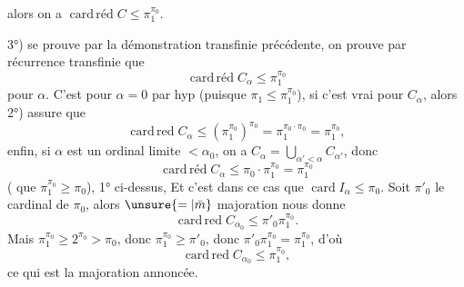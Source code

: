 alors on a $\operatorname{card\,réd}C\leq\pi_1^{\pi_0}$.

 3°) se prouve par la démonstration  transfinie précédente,  on prouve par récurrence transfinie que
\[
\operatorname{card\,réd}C_\alpha\leq\pi_1^{\pi_0}
\]
pour  $\alpha$. C'est  pour $\alpha=0$ par hyp (puisque $\pi_1\leq\pi_1^{\pi_0}$),  si c'est vrai pour $C_\alpha$, alors 2°) assure que
\[
\operatorname{card\,red}C_\alpha\leq(\pi_1^{\pi_0})^{\pi_0}=\pi_1^{\pi_0\cdot\pi_0}=\pi_1^{\pi_0},
\]
enfin, si $\alpha$ est un ordinal limite $<\alpha_0$, on a $C_\alpha=\bigcup_{\alpha'<\alpha}C_{\alpha'}$, donc
\[
\operatorname{card\,réd}C_\alpha\leq\pi_0\cdot\pi_1^{\pi_0}=\pi_1^{\pi_0}
\]
( que $\pi_1^{\pi_0}\geq\pi_0$),    1° ci-dessus, Et c'est dans ce cas que $\operatorname{card}I_\alpha\leq\pi_0$. Soit $\pi'_0$ le cardinal  de $\pi_0$, alors  $\unsure{=|\bar m}$ majoration nous donne
\[
\operatorname{card\,red}C_{\alpha_0}\leq\pi'_0\pi_1^{\pi_0}.
\]
Mais  $\pi_1^{\pi_0}\geq 2^{\pi_0}>\pi_0$, donc $\pi_1^{\pi_0}\geq\pi'_0$, donc $\pi'_0\pi_1^{\pi_0}=\pi_1^{\pi_0}$, d'où
\[
\operatorname{card\,red}C_{\alpha_0}\leq\pi_1^{\pi_0},
\]
ce qui est la majoration annoncée.
